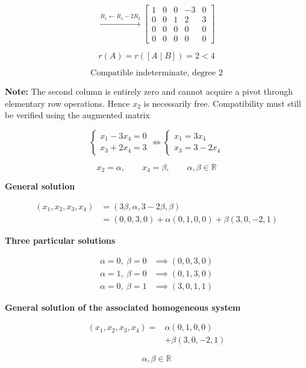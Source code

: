 \begin{answer}
    $$
    \xrightarrow{R_1\leftarrow R_1-2R_2}
    \left[
    \begin{array}{cccc|c}
    1&0&0&-3&0\\
    0&0&1&2&3\\
    0&0&0&0&0\\
    0&0&0&0&0
    \end{array}
    \right]
    $$

    $$
    r(A)=r([A\mid B])=2<4
    $$

    $$
    \boxed{
    \text{Compatible indeterminate, degree }2
    }
    $$

    {\color{red}
    \textbf{Note:} The second column is
    entirely zero and cannot acquire a
    pivot through elementary row operations.
    Hence $x_2$ is necessarily free.
    Compatibility must still be verified
    using the augmented matrix
    }

    $$
    \begin{cases}
        x_1-3x_4=0\\
        x_3+2x_4=3
    \end{cases}
    \iff
    \begin{cases}
        x_1=3x_4\\
        x_3=3-2x_4
    \end{cases}
    $$

    $$
    x_2=\alpha,\qquad
    x_4=\beta,\qquad
    \alpha,\beta\in\mathbb R
    $$

    \textbf{General solution}

    $$
    \begin{aligned}
    (x_1,x_2,x_3,x_4)
    &=(3\beta,\alpha,3-2\beta,\beta)\\
    &=(0,0,3,0)
      +\alpha(0,1,0,0)
      +\beta(3,0,-2,1)
    \end{aligned}
    $$

    \textbf{Three particular solutions}

    $$
    \begin{aligned}
    \alpha=0,\ \beta=0
    &\implies (0,0,3,0)\\
    \alpha=1,\ \beta=0
    &\implies (0,1,3,0)\\
    \alpha=0,\ \beta=1
    &\implies (3,0,1,1)
    \end{aligned}
    $$

    \textbf{General solution of the
    associated homogeneous system}

    $$
    \boxed{
    \begin{aligned}
    (x_1,x_2,x_3,x_4)
    ={}&\alpha(0,1,0,0)\\
       &+\beta(3,0,-2,1)
    \end{aligned}
    }
    $$

    $$
    \alpha,\beta\in\mathbb R
    $$
\end{answer}
